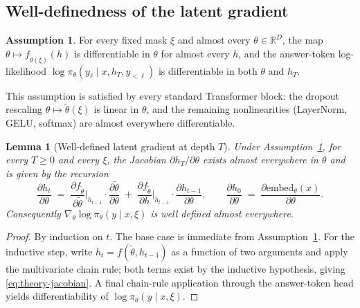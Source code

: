 \documentclass[11pt]{article}
\newtheorem{lemma}[theorem]{Lemma}
\theoremstyle{definition}
\newtheorem{assumption}[theorem]{Assumption}
\theoremstyle{remark}
\newcommand{\R}{\mathbb{R}}
\begin{document}
\subsection{Well-definedness of the latent gradient}
\label{sec:theory-welldef}

\begin{assumption}\label{ass:smooth}
For every fixed mask $\xi$ and almost every $\theta \in \R^D$, the map
$\theta \mapsto f_{\tilde\theta(\xi)}(h)$ is differentiable in
$\theta$ for almost every $h$, and the answer-token log-likelihood
$\log \pi_\theta(y_\ell \mid x, h_T, y_{<\ell})$ is differentiable in
both $\theta$ and $h_T$.
\end{assumption}

This assumption is satisfied by every standard Transformer block:
the dropout rescaling $\theta \mapsto \tilde\theta(\xi)$ is linear in
$\theta$, and the remaining nonlinearities (LayerNorm, GELU, softmax)
are almost everywhere differentiable.

\begin{lemma}[Well-defined latent gradient at depth $T$]
\label{lem:induction}
Under Assumption~\ref{ass:smooth}, for every $T \ge 0$ and every $\xi$,
the Jacobian $\partial h_T / \partial \theta$ exists almost everywhere
in $\theta$ and is given by the recursion
\begin{equation}
\frac{\partial h_t}{\partial \theta}
   \;=\;
\frac{\partial f_{\tilde\theta}}{\partial \tilde\theta}\bigg|_{h_{t-1}}
   \cdot
\frac{\partial \tilde\theta}{\partial \theta}
   \;+\;
\frac{\partial f_{\tilde\theta}}{\partial h}\bigg|_{h_{t-1}}
   \cdot
\frac{\partial h_{t-1}}{\partial \theta},
\qquad
\frac{\partial h_0}{\partial \theta}
   \;=\;
\frac{\partial \mathrm{embed}_\theta(x)}{\partial \theta}.
\label{eq:theory-jacobian}
\end{equation}
Consequently $\nabla_\theta \log \pi_\theta(y \mid x, \xi)$ is well
defined almost everywhere.
\end{lemma}

\begin{proof}
By induction on $t$.  The base case is immediate from
Assumption~\ref{ass:smooth}.  For the inductive step, write
$h_t = f(\tilde\theta, h_{t-1})$ as a function of two arguments and
apply the multivariate chain rule; both terms exist by the inductive
hypothesis, giving \eqref{eq:theory-jacobian}.  A final chain-rule
application through the answer-token head yields differentiability of
$\log \pi_\theta(y \mid x, \xi)$.
\end{proof}
\end{document}
